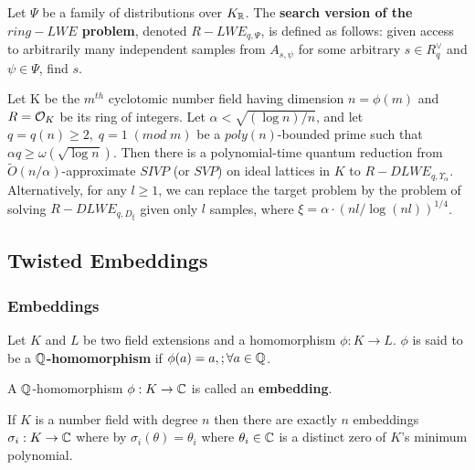 \documentclass[a4paper,12pt]{article}
\begin{document}
\begin{definition}
  \label{definition:ring-lwe-search}
Let $\Psi$ be a family of distributions over $K_{\mathbb{R}}$. The \textbf{search version of the $ring-LWE$ problem}, denoted $R-LWE_{q,\Psi}$, is defined as follows: given access to arbitrarily many independent samples from $A_{s,\psi}$ for some arbitrary $s \in R_q^\vee$ and $\psi \in \Psi$, find $s$.
\end{definition}

\begin{theorem}
  Let K be the $m^{th}$ cyclotomic number field having dimension $n = \phi(m)$ and $R =
  \mathcal{O}_K$ be its ring of integers. Let $\alpha < \sqrt{(\log{n})/n}$, and let $q = q(n)
  \geq 2, \; q = 1 \; (mod \; m)$ be a $poly(n)$-bounded prime such that $\alpha q \geq
  \omega(\sqrt{\log{n}})$. Then there is a polynomial-time quantum reduction from
  $\tilde{O}(n/\alpha)$-approximate $SIVP$ (or $SVP$) on ideal lattices in $K$ to
  $R-DLWE_{q,\Upsilon_\alpha}$. Alternatively, for any $l \geq 1$, we can replace the target
  problem by the problem of solving $R-DLWE_{q,D_\xi}$ given only $l$ samples,
  where $\xi = \alpha \cdot ( nl/ \log{(nl)} )^{1/4}$.
\end{theorem}
\subsection{Twisted Embeddings}
\label{sec:orgd2e3fc7}
\subsubsection{Embeddings}
\label{sec:orgd06ffd2}

\begin{definition}
Let $K$ and $L$ be two field extensions and a homomorphism $\phi: K \rightarrow L$. $\phi$ is said to be a \textbf{$\mathbb{Q}$-homomorphism} if $\phi(a) = a, ; \forall a \in \mathbb{Q}$.
\end{definition}

\begin{definition}
A $\mathbb{Q}$-homomorphism $\phi: K \rightarrow \mathbb{C}$ is called an \textbf{embedding}.
\end{definition}

\begin{theorem}
 If $K$ is a number field with degree $n$ then there are
exactly $n$ embeddings $\sigma_i : K \rightarrow \mathbb{C}$ where by $\sigma_i(\theta) =
\theta_i$ where $\theta_i \in \mathbb{C}$ is a distinct zero of $K$'s
minimum polynomial.
\end{theorem}
\end{document}
